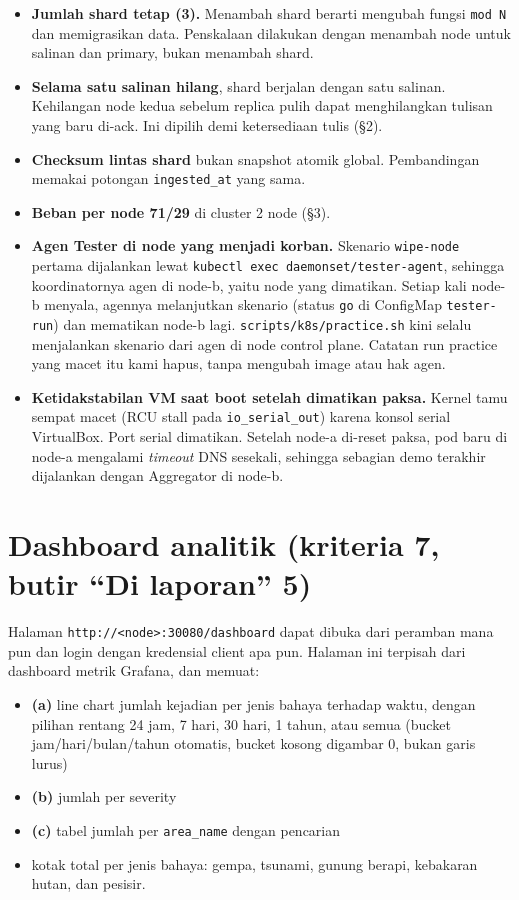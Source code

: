 \begin{itemize}
\item \textbf{Jumlah shard tetap (3).} Menambah shard berarti mengubah fungsi \texttt{mod N} dan memigrasikan data. Penskalaan dilakukan dengan menambah node untuk salinan dan primary, bukan menambah shard.
\item \textbf{Selama satu salinan hilang}, shard berjalan dengan satu salinan. Kehilangan node kedua sebelum replica pulih dapat menghilangkan tulisan yang baru di-ack. Ini dipilih demi ketersediaan tulis (§2).
\item \textbf{Checksum lintas shard} bukan snapshot atomik global. Pembandingan memakai potongan \texttt{ingested\_\allowbreak{}at} yang sama.
\item \textbf{Beban per node 71/29} di cluster 2 node (§3).
\item \textbf{Agen Tester di node yang menjadi korban.} Skenario \texttt{wipe-\allowbreak{}node} pertama dijalankan lewat \texttt{kubectl exec daemonset/\allowbreak{}tester-\allowbreak{}agent}, sehingga koordinatornya agen di node-b, yaitu node yang dimatikan. Setiap kali node-b menyala, agennya melanjutkan skenario (status \texttt{go} di ConfigMap \texttt{tester-\allowbreak{}run}) dan mematikan node-b lagi. \texttt{scripts/\allowbreak{}k8s/\allowbreak{}practice.\allowbreak{}sh} kini selalu menjalankan skenario dari agen di node control plane. Catatan run practice yang macet itu kami hapus, tanpa mengubah image atau hak agen.
\item \textbf{Ketidakstabilan VM saat boot setelah dimatikan paksa.} Kernel tamu sempat macet (RCU stall pada \texttt{io\_\allowbreak{}serial\_\allowbreak{}out}) karena konsol serial VirtualBox. Port serial dimatikan. Setelah node-a di-reset paksa, pod baru di node-a mengalami \emph{timeout} DNS sesekali, sehingga sebagian demo terakhir dijalankan dengan Aggregator di node-b.
\end{itemize}

\section{Dashboard analitik (kriteria 7, butir ``Di laporan'' 5)}

Halaman \texttt{http:/\allowbreak{}/\allowbreak{}<node>:30080/\allowbreak{}dashboard} dapat dibuka dari peramban mana pun dan login dengan kredensial client apa pun. Halaman ini terpisah dari dashboard metrik Grafana, dan memuat:


\begin{itemize}
\item \textbf{(a)} line chart jumlah kejadian per jenis bahaya terhadap waktu, dengan pilihan rentang 24 jam, 7 hari, 30 hari, 1 tahun, atau semua (bucket jam/hari/bulan/tahun otomatis, bucket kosong digambar 0, bukan garis lurus)
\item \textbf{(b)} jumlah per severity
\item \textbf{(c)} tabel jumlah per \texttt{area\_\allowbreak{}name} dengan pencarian
\item kotak total per jenis bahaya: gempa, tsunami, gunung berapi, kebakaran hutan, dan pesisir.
\end{itemize}

